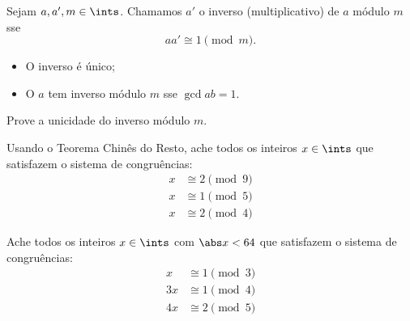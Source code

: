 \begin{definition}%
    Sejam $a,a',m\in\ints$. Chamamos $a'$ o inverso (multiplicativo) de $a$ módulo $m$ sse
    $$
        aa'\cong 1\pmod m.
    $$
    \begin{itemize}[--]
        \item O inverso é único;
        \item O $a$ tem inverso módulo $m$ sse $\gcd a b = 1.$
    \end{itemize}
\end{definition}

\begin{exercise}
    Prove a unicidade do inverso módulo $m$. 
\end{exercise}

\begin{exercise}
    Usando o Teorema Chinês do Resto, ache todos os inteiros $x\in\ints$ que satisfazem o sistema de congruências:
    \begin{align*}
        x&\cong 2\pmod 9\\
        x&\cong 1\pmod 5\\
        x&\cong 2\pmod 4
    \end{align*}
\end{exercise}

\begin{exercise}
    Ache todos os inteiros $x\in\ints$ com $\abs x < 64$ que satisfazem o sistema de congruências:
    \begin{align*}
        x &\cong 1\pmod 3\\
        3x&\cong 1\pmod 4\\
        4x&\cong 2\pmod 5
    \end{align*}
\end{exercise}

